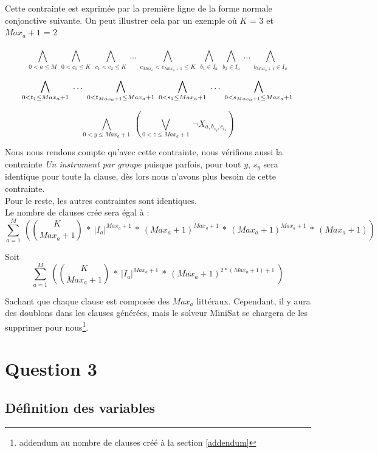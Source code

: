\documentclass[11pt]{article}
\begin{document}
Cette contrainte est exprimée par la première ligne de la forme normale conjonctive suivante. On peut illustrer cela par un exemple où $K$ = 3 et $Max_a+1$ = 2\\\\

$$\bigwedge\limits_{0<a\le M}\ \bigwedge\limits_{0<c_1\le K}\ \bigwedge\limits_{c_1<c_2\le K}\ \ldots\ \bigwedge\limits_{c_{{Max_a}}<c_{Max_{a}+1}\le K}\ \bigwedge\limits_{b_1 \in I_a}\ \bigwedge\limits_{b_2 \in I_a}\ \ldots\  \bigwedge\limits_{b_{Max_a+1} \in I_a} $$

$$ \bigwedge\limits_{0<t_{1}\le Max_a+1}\  \ldots\  \bigwedge\limits_{0<t_{Max_a+1}\le Max_a+1}\ \bigwedge\limits_{0<s_1\le Max_a+1}\  \ldots\  \bigwedge\limits_{0<s_{Max_a+1}\le Max_a+1}\\$$

$$ \bigwedge\limits_{0<y\le Max_a+1}\  \left( \bigvee\limits_{0<z\le Max_a+1}\  \neg X_{a,b_{s_{y}},c_{t_{z}}}\right)$$

Nous nous rendons compte qu'avec cette contrainte, nous vérifions aussi la contrainte \textsl{Un instrument par groupe} puisque parfois, pour tout $y$, $s_y$ sera identique pour toute la clause, dès lors nous n'avons plus besoin de cette contrainte.\\
Pour le reste, les autres contraintes sont identiques.\\

Le nombre de clauses crée sera égal à : \\

$$\sum_{a=1}^{M}\ \left( {K \choose Max_a+1}\ * \ |I_a|^{Max_a+1}\ *\ \left(Max_a+1\right)^{Max_a+1}\ *\ \left(Max_a+1\right)^{Max_a+1}\ *\  \left(Max_a+1\right) \right) $$

Soit\\

$$\sum_{a=1}^{M}\ \left( {K \choose Max_a+1}\ * \ |I_a|^{Max_a+1}\ *\ \left(Max_a+1\right)^{2*(Max_a+1)+1}\ \right) $$

Sachant que chaque clause est composée des $Max_a$ littéraux. 
Cependant, il y aura des doublons dans les clauses générées, mais le solveur MiniSat se chargera de les supprimer pour nous\footnote{addendum au nombre de clauses créé à la section \ref{addendum}}.

\section{Question 3}

\subsection{Définition des variables}
\end{document}
